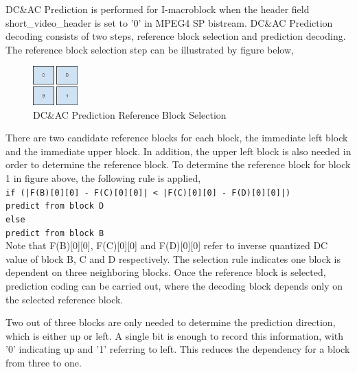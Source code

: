 DC\&AC Prediction is performed for I-macroblock when the header field short\_video\_header is set to '0' in MPEG4 SP bistream. DC\&AC Prediction decoding consists of two steps, reference block selection and prediction decoding. The reference block selection step can be illustrated by figure below,
\begin{figure}
\centering 
\includegraphics[height=1.5cm]{2.eps}
\caption{DC\&AC Prediction Reference Block Selection}
\end{figure}
There are two candidate reference blocks for each block, the immediate left block and the immediate upper block. In addition, the upper left block is also needed in order to determine the reference block. To determine the reference block for block 1 in figure above, the following rule is applied,
{\tt \\if (|F(B)[0][0] - F(C)[0][0]| < |F(C)[0][0] - F(D)[0][0]|)\\
\indent predict from block D \\
else  \\
\indent predict from block B \\} 
Note that F(B)[0][0], F(C)[0][0] and F(D)[0][0] refer to inverse quantized DC value of block B, C and D respectively. The selection rule indicates one block is dependent on three neighboring blocks. Once the reference block is selected, prediction coding can be carried out, where the decoding block depends only on the selected reference block.

Two out of three blocks are only needed to determine the prediction direction, which is either up or left. A single bit is enough to record this information, with '0' indicating up and '1' referring to left. This reduces the dependency for a block from three to one.

